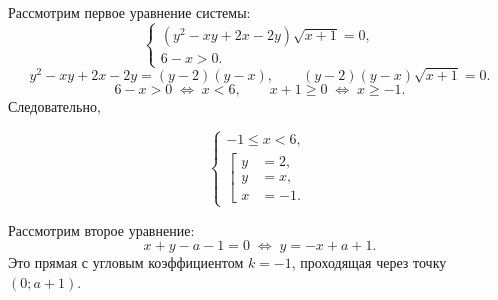 \documentclass[12pt,a4paper]{article}
\newcommand{\eqv}{\;\Longleftrightarrow\;}
\begin{document}
Рассмотрим первое уравнение системы:
\[
\begin{cases}
(y^2-xy+2x-2y)\sqrt{x+1}=0,\\
6-x>0.
\end{cases}
\]
\[
y^2-xy+2x-2y=(y-2)(y-x),
\qquad
(y-2)(y-x)\sqrt{x+1}=0.
\]
\[
6-x>0\eqv x<6,
\qquad
x+1\ge0\eqv x\ge-1.
\]
Следовательно,
\begin{formulaBox}
\[
\begin{cases}
-1\le x<6,\\[1mm]
\left[\begin{aligned}
y&=2,\\
y&=x,\\
x&=-1.
\end{aligned}\right.
\end{cases}
\]
\end{formulaBox}

Рассмотрим второе уравнение:
\[
x+y-a-1=0\eqv\boxed{y=-x+a+1}.
\]
Это прямая с угловым коэффициентом $k=-1$, проходящая через точку $(0;a+1)$.
\end{document}
